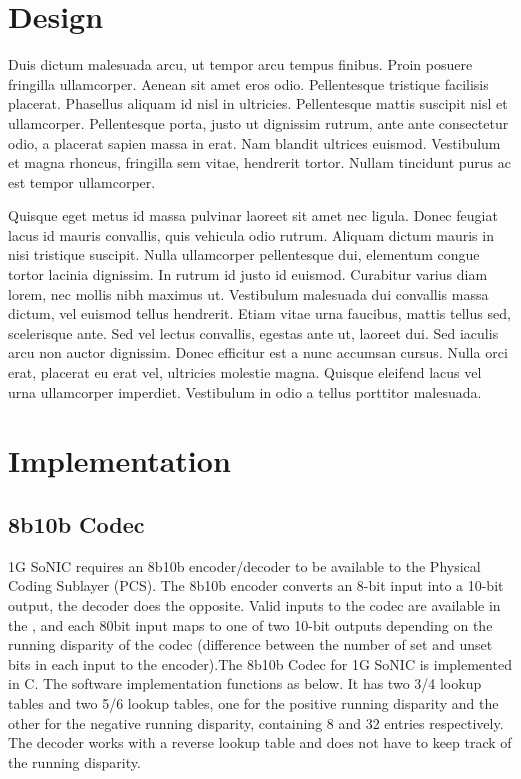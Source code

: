 \documentclass[conference]{IEEEtran}
\begin{document}
\section{Design}

Duis dictum malesuada arcu, ut tempor arcu tempus finibus. Proin posuere fringilla ullamcorper. Aenean sit amet eros odio. Pellentesque tristique facilisis placerat. Phasellus aliquam id nisl in ultricies. Pellentesque mattis suscipit nisl et ullamcorper. Pellentesque porta, justo ut dignissim rutrum, ante ante consectetur odio, a placerat sapien massa in erat. Nam blandit ultrices euismod. Vestibulum et magna rhoncus, fringilla sem vitae, hendrerit tortor. Nullam tincidunt purus ac est tempor ullamcorper.

Quisque eget metus id massa pulvinar laoreet sit amet nec ligula. Donec feugiat lacus id mauris convallis, quis vehicula odio rutrum. Aliquam dictum mauris in nisi tristique suscipit. Nulla ullamcorper pellentesque dui, elementum congue tortor lacinia dignissim. In rutrum id justo id euismod. Curabitur varius diam lorem, nec mollis nibh maximus ut. Vestibulum malesuada dui convallis massa dictum, vel euismod tellus hendrerit. Etiam vitae urna faucibus, mattis tellus sed, scelerisque ante. Sed vel lectus convallis, egestas ante ut, laoreet dui. Sed iaculis arcu non auctor dignissim. Donec efficitur est a nunc accumsan cursus. Nulla orci erat, placerat eu erat vel, ultricies molestie magna. Quisque eleifend lacus vel urna ullamcorper imperdiet. Vestibulum in odio a tellus porttitor malesuada.

\section{Implementation}

\subsection{8b10b Codec}

1G SoNIC requires an 8b10b encoder/decoder to be available to the Physical Coding Sublayer (PCS). The 8b10b encoder converts an 8-bit input into a 10-bit output, the decoder does the opposite. Valid inputs to the codec are available in the \cite{ieeestandard}, and each 80bit input maps to one of two 10-bit outputs depending on the running disparity of the codec (difference between the number of set and unset bits in each input to the encoder).The 8b10b Codec for 1G SoNIC is implemented in C. The software implementation functions as below. It has two 3/4 lookup tables and two 5/6 lookup tables, one for the positive running disparity and the other for the negative running disparity, containing 8 and 32 entries respectively. The decoder works with a reverse lookup table and does not have to keep track of the running disparity.
\end{document}
